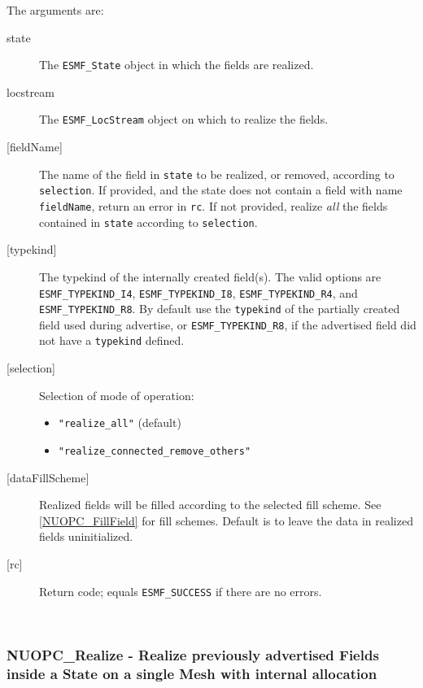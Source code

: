      The arguments are:
     \begin{description}
     \item[state]
       The {\tt ESMF\_State} object in which the fields are realized.
     \item[locstream]
       The {\tt ESMF\_LocStream} object on which to realize the fields.
     \item[{[fieldName]}]
       The name of the field in {\tt state} to be realized, or removed, according
       to {\tt selection}. If provided, and the state does not contain a field
       with name {\tt fieldName}, return an error in {\tt rc}. If not provided,
       realize {\em all} the fields contained in {\tt state} according to 
       {\tt selection}.
     \item[{[typekind]}]
       The typekind of the internally created field(s). The valid options are
       {\tt ESMF\_TYPEKIND\_I4}, {\tt ESMF\_TYPEKIND\_I8},
       {\tt ESMF\_TYPEKIND\_R4}, and {\tt ESMF\_TYPEKIND\_R8}.
       By default use the {\tt typekind} of the partially created field used
       during advertise, or {\tt ESMF\_TYPEKIND\_R8}, if the advertised field 
       did not have a {\tt typekind} defined.
     \item[{[selection]}]
       Selection of mode of operation:
       \begin{itemize}
       \item {\tt "realize\_all"} (default)
       \item {\tt "realize\_connected\_remove\_others"}
       \end{itemize}
     \item[{[dataFillScheme]}]
       Realized fields will be filled according to the selected fill
       scheme. See \ref{NUOPC_FillField} for fill schemes. Default is to leave
       the data in realized fields uninitialized.
     \item[{[rc]}]
       Return code; equals {\tt ESMF\_SUCCESS} if there are no errors.
     \end{description}
   
 
\mbox{}\hrulefill\ 
 
\subsubsection [NUOPC\_Realize] {NUOPC\_Realize - Realize previously advertised Fields inside a State on a single Mesh with internal allocation}


